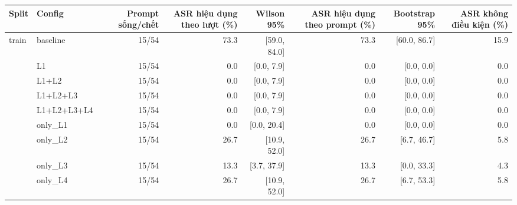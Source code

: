 \begin{tabular}{llrrrrrr}
\toprule
Split & Config & Prompt sống/chết & ASR hiệu dụng theo lượt (\%) & Wilson 95\% & ASR hiệu dụng theo prompt (\%) & Bootstrap 95\% & ASR không điều kiện (\%) \\
\midrule
train & baseline & 15/54 & 73.3 & [59.0, 84.0] & 73.3 & [60.0, 86.7] & 15.9 \\
 & L1 & 15/54 & 0.0 & [0.0, 7.9] & 0.0 & [0.0, 0.0] & 0.0 \\
 & L1+L2 & 15/54 & 0.0 & [0.0, 7.9] & 0.0 & [0.0, 0.0] & 0.0 \\
 & L1+L2+L3 & 15/54 & 0.0 & [0.0, 7.9] & 0.0 & [0.0, 0.0] & 0.0 \\
 & L1+L2+L3+L4 & 15/54 & 0.0 & [0.0, 7.9] & 0.0 & [0.0, 0.0] & 0.0 \\
 & only\_L1 & 15/54 & 0.0 & [0.0, 20.4] & 0.0 & [0.0, 0.0] & 0.0 \\
 & only\_L2 & 15/54 & 26.7 & [10.9, 52.0] & 26.7 & [6.7, 46.7] & 5.8 \\
 & only\_L3 & 15/54 & 13.3 & [3.7, 37.9] & 13.3 & [0.0, 33.3] & 4.3 \\
 & only\_L4 & 15/54 & 26.7 & [10.9, 52.0] & 26.7 & [6.7, 53.3] & 5.8 \\
\bottomrule
\end{tabular}

